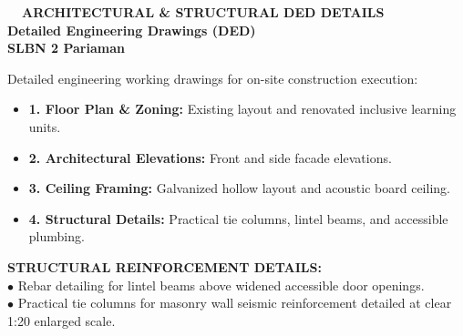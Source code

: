 \documentclass[10pt,a4paper,landscape]{article}
\begin{document}
\noindent
\begin{minipage}[t]{0.30\linewidth}
  \vspace{0pt}
  \begin{tcolorbox}[sharp corners, boxrule=0.8pt, colframe=pborder, colback=white, left=3mm, right=3mm, top=2.5mm, bottom=2.5mm, height=100mm]
    \colorbox{pred}{\fontsize{7pt}{8pt}\selectfont\bfseries\color{white}\ \ ARCHITECTURAL \& STRUCTURAL DED DETAILS\ \ }\\[1.5mm]
    {\fontsize{9.5pt}{11.5pt}\selectfont\bfseries\color{pnavy}Detailed Engineering Drawings (DED)}\\[0.5mm]
    {\fontsize{7pt}{8.5pt}\selectfont\bfseries\color{pred}SLBN 2 Pariaman}\\[2mm]

    {\fontsize{6.5pt}{8.2pt}\selectfont\color{psteel}
    Detailed engineering working drawings for on-site construction execution:
    \begin{itemize}[leftmargin=3mm, itemsep=0.6mm, topsep=0mm]
      \item \textbf{1. Floor Plan \& Zoning:} Existing layout and renovated inclusive learning units.
      \item \textbf{2. Architectural Elevations:} Front and side facade elevations.
      \item \textbf{3. Ceiling Framing:} Galvanized hollow layout and acoustic board ceiling.
      \item \textbf{4. Structural Details:} Practical tie columns, lintel beams, and accessible plumbing.
    \end{itemize}
    }
  \end{tcolorbox}
  \vspace{2mm}

  \begin{tcolorbox}[sharp corners, boxrule=0.6pt, colframe=pnavy, colback=pbglight, left=2.5mm, right=2.5mm, top=2mm, bottom=2mm, height=52mm]
    {\fontsize{7pt}{8.5pt}\selectfont\bfseries\color{pnavy}STRUCTURAL REINFORCEMENT DETAILS:}\\[1.5mm]
    {\fontsize{6.5pt}{8.2pt}\selectfont\color{psteel}
    $\bullet$ Rebar detailing for lintel beams above widened accessible door openings.\\
    $\bullet$ Practical tie columns for masonry wall seismic reinforcement detailed at clear 1:20 enlarged scale.
    }
  \end{tcolorbox}
\end{minipage}%
\hfill
\end{document}
